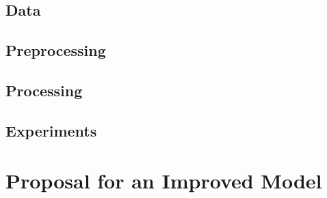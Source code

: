 \documentclass[a4paper]{article}
\begin{document}
\subsection{Data}


\subsection{Preprocessing}


\subsection{Processing}


\subsection{Experiments}

\section{Proposal for an Improved Model}



\end{document}

